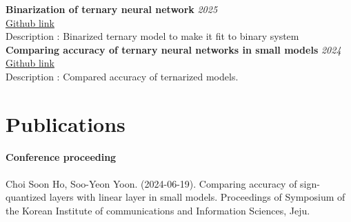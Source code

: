 \documentclass[11pt, a4paper]{article}
\newcommand{\itemheader}[2]{
    \noindent\textbf{#1} \hfill \textit{#2} \\
}
\begin{document}
\itemheader{Binarization of ternary neural network}{2025}
\href{https://github.com/Snow0821/plinear/tree/main/Experiments/binarization_of_ternary_neural_networks}{Github link}\\
Description : Binarized ternary model to make it fit to binary system\\

\itemheader{Comparing accuracy of ternary neural networks in small models}{2024}
\href{https://github.com/Snow0821/Comparing_Accuracy_of_Ternary_Neural_Networks_in_Small_Models}{Github link}\\
Description : Compared accuracy of ternarized models.\\

\section*{Publications}

\noindent
\itemheader{Conference proceeding} \\
\text{[1]} Choi Soon Ho, Soo-Yeon Yoon. (2024-06-19). Comparing accuracy of sign-quantized layers with linear layer in small models. Proceedings of Symposium of the Korean Institute of communications and Information Sciences, Jeju.\relax
\end{document}

